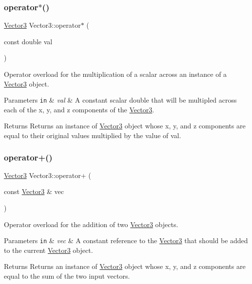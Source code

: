 \subsubsection{\texorpdfstring{operator$\ast$()}{operator*()}}
{\footnotesize\ttfamily \hyperlink{classVector3}{Vector3} Vector3\+::operator$\ast$ (\begin{DoxyParamCaption}\item[{const double}]{val }\end{DoxyParamCaption})}



Operator overload for the multiplication of a scalar across an instance of a \hyperlink{classVector3}{Vector3} object. 


\begin{DoxyParams}[1]{Parameters}
\mbox{\tt in}  & {\em val} & A constant scalar double that will be multipled across each of the x, y, and z components of the \hyperlink{classVector3}{Vector3}.\\
\hline
\end{DoxyParams}
\begin{DoxyReturn}{Returns}
Returns an instance of \hyperlink{classVector3}{Vector3} object whose x, y, and z components are equal to their original values multiplied by the value of val. 
\end{DoxyReturn}
\mbox{\label{classVector3_ae8a28dd5a00fa5a2bf5427b0f7a59e58}} 
\subsubsection{\texorpdfstring{operator+()}{operator+()}}
{\footnotesize\ttfamily \hyperlink{classVector3}{Vector3} Vector3\+::operator+ (\begin{DoxyParamCaption}\item[{const \hyperlink{classVector3}{Vector3} \&}]{vec }\end{DoxyParamCaption})}



Operator overload for the addition of two \hyperlink{classVector3}{Vector3} objects. 


\begin{DoxyParams}[1]{Parameters}
\mbox{\tt in}  & {\em vec} & A constant reference to the \hyperlink{classVector3}{Vector3} that should be added to the current \hyperlink{classVector3}{Vector3} object.\\
\hline
\end{DoxyParams}
\begin{DoxyReturn}{Returns}
Returns an instance of \hyperlink{classVector3}{Vector3} object whose x, y, and z components are equal to the sum of the two input vectors. 
\end{DoxyReturn}
\mbox{\label{classVector3_a71264029df074d12dbcd57a95a136fd6}} 
